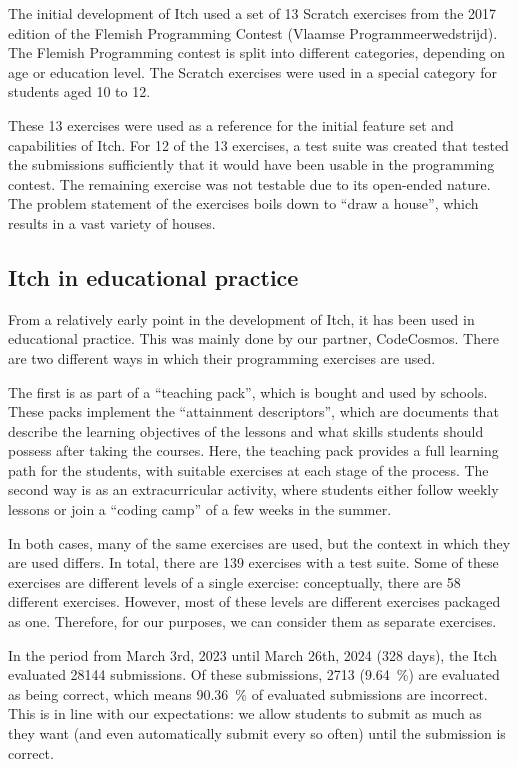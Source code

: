 \documentclass[../main]{subfiles}
\begin{document}
The initial development of Itch used a set of 13 Scratch exercises from the 2017 edition of the Flemish Programming Contest (\textdutch{Vlaamse Programmeerwedstrijd}).
The Flemish Programming contest is split into different categories, depending on age or education level.
The Scratch exercises were used in a special category for students aged 10 to 12.

These 13 exercises were used as a reference for the initial feature set and capabilities of Itch.
For 12 of the 13 exercises, a test suite was created that tested the submissions sufficiently that it would have been usable in the programming contest.
The remaining exercise was not testable due to its open-ended nature.
The problem statement of the exercises boils down to ``draw a house'', which results in a vast variety of houses.

\subsection{Itch in educational practice}\label{subsec:itch-in-educational-practice}

From a relatively early point in the development of Itch, it has been used in educational practice.
This was mainly done by our partner, CodeCosmos.
There are two different ways in which their programming exercises are used.

The first is as part of a ``teaching pack'', which is bought and used by schools.
These packs implement the ``attainment descriptors'', which are documents that describe the learning objectives of the lessons and what skills students should possess after taking the courses.
Here, the teaching pack provides a full learning path for the students, with suitable exercises at each stage of the process.
The second way is as an extracurricular activity, where students either follow weekly lessons or join a ``coding camp'' of a few weeks in the summer.

In both cases, many of the same exercises are used, but the context in which they are used differs.
In total, there are 139 exercises with a test suite.
Some of these exercises are different levels of a single exercise: conceptually, there are 58 different exercises.
However, most of these levels are different exercises packaged as one.
Therefore, for our purposes, we can consider them as separate exercises.

In the period from March 3rd, 2023 until March 26th, 2024 (328 days), the Itch evaluated \num{28144} submissions.
Of these submissions, \num{2713} (\qty{9.64}{\percent}) are evaluated as being correct, which means \qty{90.36}{\percent} of evaluated submissions are incorrect.
This is in line with our expectations: we allow students to submit as much as they want (and even automatically submit every so often) until the submission is correct.
\end{document}
